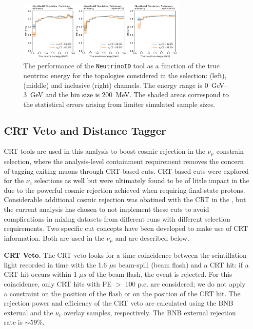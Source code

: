\begin{figure}[H]
    \centering
    \includegraphics[width=0.75\textwidth]{NueCCsel/Images/truth/sliceID_eff.pdf}
    \caption{The performance of the \texttt{NeutrinoID} tool as a function of the true neutrino energy for the topologies considered in the \nuecc selection: \zpsel (left), \npsel (middle) and inclusive (right) channels. The energy range is \SIrange{0}{3}{\GeV} and the bin size is \SI{200}{\MeV}. The shaded areas correspond to the statistical errors arising from limiter simulated sample sizes.}
    \label{fig:sliceid_eff}
\end{figure}



\subsection{CRT Veto and Distance Tagger}
\label{sec:sliceID:CRT}
CRT tools are used in this analysis to boost cosmic rejection in the $\nu_{\mu}$ constrain selection, where the analysis-level containment requirement removes the concern of tagging exiting muons through CRT-based cuts. CRT-based cuts were explored for the $\nu_e$ selections as well but were ultimately found to be of little impact in the \npsel due to the powerful cosmic rejection achieved when requiring final-state protons. Considerable additional cosmic rejection was obatined with the CRT in the \zpsel, but the current analysis has chosen to not implement these cuts to avoid complications in mixing datasets from different runs with different selection requirements. Two specific cut concepts have been developed to make use of CRT information. Both are used in the $\nu_{\mu}$ and are described below.

\textbf{CRT Veto.} The CRT veto looks for a time coincidence between the scintillation light recorded in time with the 1.6 $\mu$s beam-spill (beam flash) and a CRT hit: if a CRT hit occurs within 1 $\mu s$ of the beam flash, the event is rejected. For this coincidence, only CRT hits with PE $>$ 100 p.e. are considered; we do not apply a constraint on the position of the flash or on the position of the CRT hit. 
The rejection power and efficiency of the CRT veto are calculated using the BNB external and the $\nu_e$ overlay samples, respectively. The BNB external rejection rate is $\sim$59\%. %


